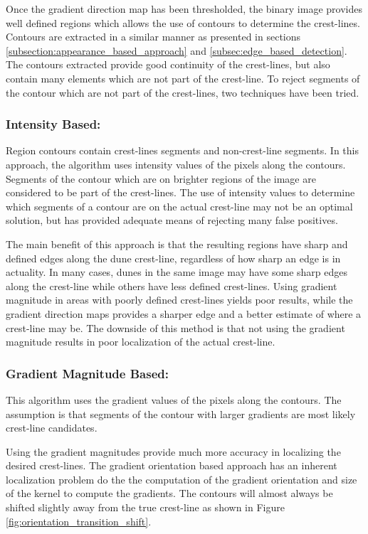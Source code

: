 Once the gradient direction map has been thresholded, the binary image provides well defined regions which allows the use of contours to determine the crest-lines. Contours are extracted in a similar manner as presented in sections \ref{subsection:appearance_based_approach} and \ref{subsec:edge_based_detection}. The contours extracted provide good continuity of the crest-lines, but also contain many elements which are not part of the crest-line. To reject segments of the contour which are not part of the crest-lines, two techniques have been tried.

\subsubsection*{Intensity Based:}

Region contours contain crest-lines segments and non-crest-line segments. In this approach, the algorithm uses intensity values of the pixels along the contours. Segments of the contour which are on brighter regions of the image are considered to be part of the crest-lines. The use of intensity values to determine which segments of a contour are on the actual crest-line may not be an optimal solution, but has provided adequate means of rejecting many false positives.

The main benefit of this approach is that the resulting regions have sharp and defined edges along the dune crest-line, regardless of how sharp an edge is in actuality. In many cases, dunes in the same image may have some sharp edges along the crest-line while others have less defined crest-lines. Using gradient magnitude in areas with poorly defined crest-lines yields poor results, while the gradient direction maps provides a sharper edge and a better estimate of where a crest-line may be. The downside of this method is that not using the gradient magnitude results in poor localization of the actual crest-line.

\subsubsection*{Gradient Magnitude Based:} \label{subsubsec:gradient_magnitude_based_shift}

This algorithm uses the gradient values of the pixels along the contours. The assumption is that segments of the contour with larger gradients are most likely crest-line candidates. 

Using the gradient magnitudes provide much more accuracy in localizing the desired crest-lines. The gradient orientation based approach has an inherent localization problem do the the computation of the gradient orientation and size of the kernel to compute the gradients. The contours will almost always be shifted slightly away from the true crest-line as shown in Figure \ref{fig:orientation_transition_shift}.


